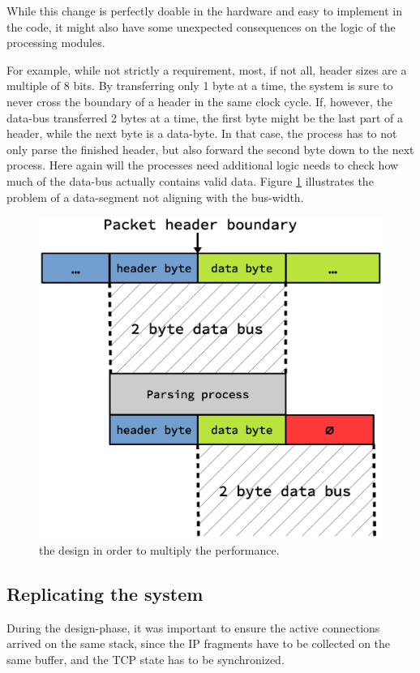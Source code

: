 While this change is perfectly doable in the hardware and easy to implement in
the code, it might also have some unexpected consequences on the logic of the
processing modules.

For example, while not strictly a requirement, most, if not all, header sizes
are a multiple of 8 bits. By transferring only 1 byte at a time, the system is
sure to never cross the boundary of a header in the same clock cycle. If,
however, the data-bus transferred 2 bytes at a time, the first byte might be
the last part of a header, while the next byte is a data-byte. In that case,
the process has to not only parse the finished header, but also forward the
second byte down to the next process. Here again will the processes need
additional logic needs to check how much of the data-bus actually contains
valid data. Figure \ref{fig:bus_width_boundaries} illustrates the problem of a
data-segment not aligning with the bus-width.

\begin{figure}
\centering
\includegraphics[scale=0.45]{discussion/bus_width_boundaries.eps}
\caption{the design in order to multiply the
performance. }
\label{fig:bus_width_boundaries}
\end{figure}





\subsection{Replicating the system}
During the design-phase, it was important to ensure the active connections
arrived on the same stack, since the IP fragments have to be collected on the
same buffer, and the TCP state has to be synchronized.

